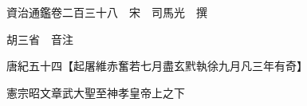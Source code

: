 










 


 
 


 

  
  
  
  
  





  
  
  
  
  
 
  

  

  
  
  



  

 
 

  
   




  

  
  


  　　資治通鑑卷二百三十八　宋　司馬光　撰

　　胡三省　音注

　　唐紀五十四【起屠維赤奮若七月盡玄黓執徐九月凡三年有奇】

　　憲宗昭文章武大聖至神孝皇帝上之下

